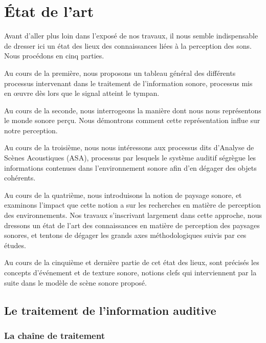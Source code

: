 \chapter{État de l'art}\label{ch:psycho_ea}


Avant d'aller plus loin dans l'exposé de nos travaux, il nous semble indispensable de dresser ici un état des lieux des connaissances liées à la perception des sons. Nous procédons en cinq parties. 

Au cours de la première, nous proposons un tableau général des différents processus intervenant dans le traitement de l'information sonore, processus mis en œuvre dès lors que le signal atteint le tympan. 

Au cours de la seconde, nous interrogeons la manière dont nous nous représentons le monde sonore perçu. Nous démontrons comment cette représentation influe sur notre perception. 

Au cours de la troisième, nous nous intéressons aux processus dits d'Analyse de Scènes Acoustiques (ASA), processus par lesquels le système auditif ségrègue les informations contenues dans l'environnement sonore afin d'en dégager des objets cohérents. 

Au cours de la quatrième, nous introduisons la notion de paysage sonore, et examinons l'impact que cette notion a sur les recherches en matière de perception des environnements. Nos travaux s'inscrivant largement dans cette approche, nous dressons un état de l'art des connaissances en matière de perception des paysages sonores, et tentons de dégager les grands axes méthodologiques suivis par ces études.

Au cours de la cinquième et dernière partie de cet état des lieux, sont précisés les concepts d'événement et de texture sonore, notions clefs qui interviennent par la suite dans le modèle de scène sonore proposé.


\section{Le traitement de l'information auditive}

\subsection{La chaîne de traitement}
\label{sec:chaineTaite}

